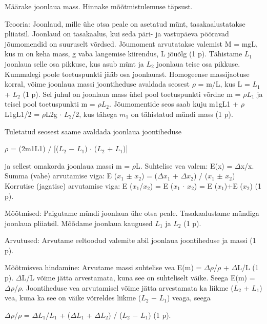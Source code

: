 
Määrake joonlaua mass. Hinnake mõõtmistulemuse täpsust.

\hint

\solu
Teooria: Joonlaud, mille ühe otsa peale on asetatud münt, tasakaalustatakse pliiatsil. Joonlaud on tasakaalus, kui seda päri- ja vastupäeva pööravad jõumomendid on suuruselt võrdsed. Jõumoment arvutatakse valemist M = mgL, kus m on keha mass, g vaba langemise kiirendus, L jõuõlg (1 p). Tähistame $L_1$ joonlaua selle osa pikkuse, kus asub münt ja $L_2$ joonlaua teise osa pikkuse. Kummalegi poole toetuspunkti jääb osa joonlauast. Homogeense massijaotuse korral, võime joonlaua massi joontiheduse avaldada seosest $\rho$ = m/L, kus L = $L_1$ + $L_2$ (1 p). Sel juhul on joonlaua mass ühel pool toetuspunkti võrdne m = $\rho$$L_1$ ja teisel pool toetuspunkti m = $\rho$$L_2$. Jõumomentide seos saab kuju m1gL1 + $\rho$L1gL1/2 = $\rho$L2g $\cdot$ $L_2$/2, kus tähega $m_1$ on tähistatud mündi mass (1 p).

Tuletatud seosest saame avaldada joonlaua joontiheduse

$\rho$ = (2m1L1) / [($L_2$ $-$ $L_1$) $\cdot$ ($L_2$ + $L_1$)]

ja sellest omakorda joonlaua massi m = $\rho$L. Suhtelise vea valem: E(x) = $\Delta$x/x. Summa (vahe) arvutamise viga: E ($x_1$ $\pm$ $x_2$) = ($\Delta$$x_1$ + $\Delta$$x_2$) / ($x_1$ $\pm$ $x_2$) Korrutise (jagatise) arvutamise viga: E ($x_1$/$x_2$) = E ($x_1$ $\cdot$ $x_2$) = E ($x_1$)+E ($x_2$) (1 p).

Mõõtmised: Paigutame mündi joonlaua ühe otsa peale. Tasakaalustame mündiga joonlaua pliiatsil. Mõõdame joonlaua kaugused $L_1$ ja $L_2$ (1 p).

Arvutused: Arvutame eeltoodud valemite abil joonlaua joontiheduse ja massi (1 p).

Mõõtmisvea hindamine: Arvutame massi suhtelise vea E(m) = $\Delta\rho$/$\rho$ + $\Delta$L/L (1 p). $\Delta$L/L võime jätta arvestamata, kuna see on suhteliselt väike. Seega E(m) = $\Delta\rho$/$\rho$. Joontiheduse vea arvutamisel võime jätta arvestamata ka liikme ($L_2$ + $L_1$) vea, kuna ka see on väike võrreldes liikme ($L_2$ $-$ $L_1$) veaga, seega

$\Delta\rho$/$\rho$ = $\Delta$$L_1$/$L_1$ + ($\Delta$$L_1$ + $\Delta$$L_2$) / ($L_2$ $-$ $L_1$) (1 p).
\probend
